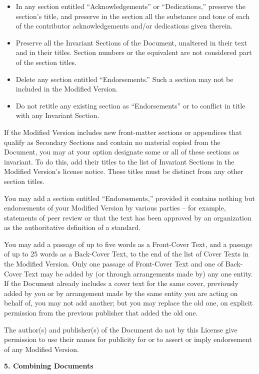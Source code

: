\documentclass{doc}
\begin{document}
\begin{itemize}
\item In any section entitled ``Acknowledgements'' or ``Dedications,''
   preserve the section's title, and preserve in the section all the
   substance and tone of each of the contributor acknowledgements
   and/or dedications given therein.
\item Preserve all the Invariant Sections of the Document,
   unaltered in their text and in their titles.  Section numbers
   or the equivalent are not considered part of the section titles.
\item Delete any section entitled ``Endorsements.''  Such a section
   may not be included in the Modified Version.
\item Do not retitle any existing section as ``Endorsements''
   or to conflict in title with any Invariant Section.
\end{itemize}

If the Modified Version includes new front-matter sections or
appendices that qualify as Secondary Sections and contain no material
copied from the Document, you may at your option designate some or all
of these sections as invariant.  To do this, add their titles to the
list of Invariant Sections in the Modified Version's license notice.
These titles must be distinct from any other section titles.

You may add a section entitled ``Endorsements,'' provided it contains
nothing but endorsements of your Modified Version by various
parties -- for example, statements of peer review or that the text has
been approved by an organization as the authoritative definition of a
standard.

You may add a passage of up to five words as a Front-Cover Text, and a
passage of up to 25 words as a Back-Cover Text, to the end of the list
of Cover Texts in the Modified Version.  Only one passage of
Front-Cover Text and one of Back-Cover Text may be added by (or
through arrangements made by) any one entity.  If the Document already
includes a cover text for the same cover, previously added by you or
by arrangement made by the same entity you are acting on behalf of,
you may not add another; but you may replace the old one, on explicit
permission from the previous publisher that added the old one.

The author(s) and publisher(s) of the Document do not by this License
give permission to use their names for publicity for or to assert or
imply endorsement of any Modified Version.


\noindent\textbf{5. Combining Documents}
\end{document}
